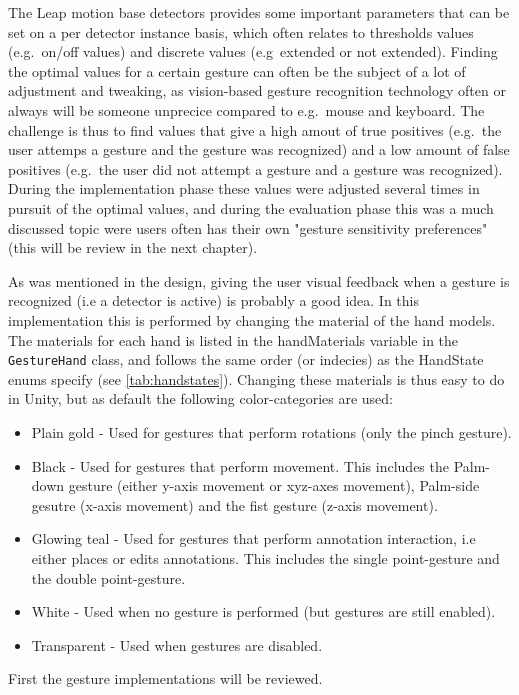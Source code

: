 The Leap motion base detectors provides some important parameters that can be set on a per detector instance basis, which often relates to thresholds values (e.g.~on/off values) and discrete
values (e.g~extended or not extended). Finding the optimal values for a certain gesture can often be the subject of a lot of adjustment and tweaking, as vision-based gesture recognition
technology often or always will be someone unprecice compared to e.g.~mouse and keyboard. The challenge is thus to find values that give a high amout of true positives (e.g.~the user attemps a gesture
and the gesture was recognized) and a low amount of false positives (e.g.~the user did not attempt a gesture and a gesture was recognized). 
During the implementation phase these values were adjusted several times in pursuit of the optimal values, and during the evaluation phase this was a much discussed topic were users often 
has their own "gesture sensitivity preferences" (this will be review in the next chapter). 

As was mentioned in the design, giving the user visual feedback when a gesture is recognized (i.e a detector is active) is probably a good idea.
In this implementation this is performed by changing the material of the hand models. The materials for each hand is listed in the handMaterials variable in the
\texttt{GestureHand} class, and follows the same order (or indecies) as the HandState enums specify (see \ref{tab:handstates}). 
Changing these materials is thus easy to do in Unity, but as default the following color-categories are used:
\begin{itemize}
\item Plain gold   - Used for gestures that perform rotations (only the pinch gesture).
\item Black 	   - Used for gestures that perform movement. This includes the Palm-down gesture (either y-axis movement or xyz-axes movement), 
			  		 Palm-side gesutre (x-axis movement) and the fist gesture (z-axis movement).
\item Glowing teal - Used for gestures that perform annotation interaction, i.e either places or edits annotations.
					 This includes the single point-gesture and the double point-gesture.
\item White 	   - Used when no gesture is performed (but gestures are still enabled).
\item Transparent  - Used when gestures are disabled.					
\end{itemize}

First the gesture implementations will be reviewed. 


